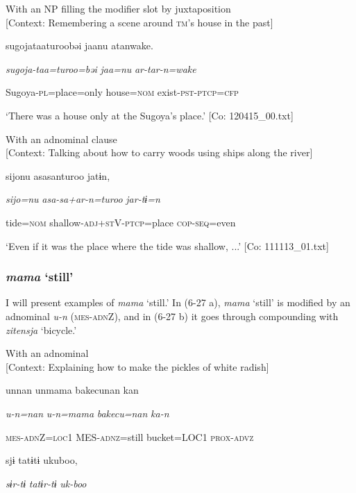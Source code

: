 \ea\label{ex:6-26}
\ea With an NP filling the modifier slot by juxtaposition\\{}
[Context: Remembering a scene around \textsc{tm}’s house in the past]

{\TM}
\gll sugojataaturoobəi  jaanu  atanwake.

      \textit{sugoja-taa=turoo=bəi}  \textit{jaa=nu}  \textit{ar-tar-n=wake}

      Sugoya-\textsc{pl}=place=only  house=\textsc{nom}  exist-\textsc{pst}-\textsc{ptcp}=\textsc{cfp}

\glt ‘There was a house only at the Sugoya’s place.’ [Co: 120415\_00.txt]
\z

 \ex With an adnominal clause\\{}
[Context: Talking about how to carry woods using ships along the river]

{\TM}
\gll {\textbar}sijo{\textbar}nu  asasanturoo  jatɨn,

      \textit{sijo=nu}  \textit{asa-sa+ar-n=turoo}  \textit{jar-tɨ=n}

      tide=\textsc{nom}  shallow-\textsc{adj}+\textsc{st}V-\textsc{ptcp}=place  \textsc{cop}-\textsc{seq}=even

\glt ‘Even if it was the place where the tide was shallow, ...’ [Co: 111113\_01.txt]
\z

\subsubsection{ \textit{mama} ‘still’}

I will present examples of \textit{mama} ‘still.’ In (6-27 a), \textit{mama} ‘still’ is modified by an adnominal \textit{u-n} (\textsc{mes}-\textsc{adn}Z), and in (6-27 b) it goes through compounding with \textit{zitensja} ‘bicycle.’

\ea\label{ex:6-27}
\ea With an adnominal\\{}
[Context: Explaining how to make the pickles of white radish]

{\TM}
\gll unnan  unmama  {\textbar}bakecu{\textbar}nan  kan

      \textit{u-n=nan}  \textit{u-n=mama}  \textit{bakecu=nan}  \textit{ka-n}

      \textsc{mes}-\textsc{adn}Z=\textsc{loc}1  MES-\textsc{adnz}=still  bucket=LOC1  \textsc{prox}-\textsc{advz}

      sjɨ  tatɨtɨ  ukuboo,

      \textit{sɨr-tɨ}  \textit{tatɨr-tɨ}  \textit{uk-boo}

